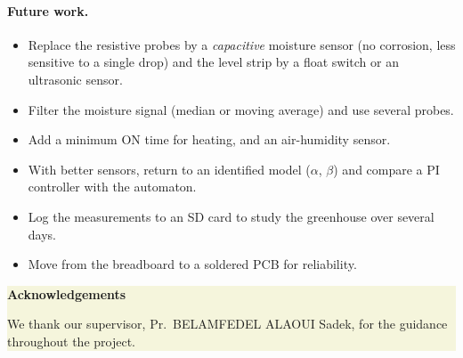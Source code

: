 \documentclass[10pt,a4paper,twocolumn]{article}
\newcommand{\infobox}[2]{%
  \par\noindent\colorbox{beige}{\parbox{\dimexpr\columnwidth-2\fboxsep}{%
  \sffamily\small\textbf{\color{accent}#1}\par\smallskip\rmfamily #2}}\par}
\begin{document}
\paragraph{Future work.}
\begin{itemize}
  \item Replace the resistive probes by a \emph{capacitive} moisture sensor (no
        corrosion, less sensitive to a single drop) and the level strip by a float
        switch or an ultrasonic sensor.
  \item Filter the moisture signal (median or moving average) and use several probes.
  \item Add a minimum ON time for heating, and an air-humidity sensor.
  \item With better sensors, return to an identified model ($\alpha$, $\beta$) and
        compare a PI controller with the automaton.
  \item Log the measurements to an SD card to study the greenhouse over several days.
  \item Move from the breadboard to a soldered PCB for reliability.
\end{itemize}

\bigskip
\infobox{Acknowledgements}{We thank our supervisor, Pr.\ BELAMFEDEL ALAOUI Sadek, for
the guidance throughout the project.}
\end{document}
